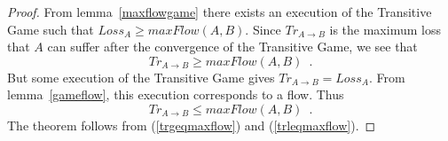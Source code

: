 \begin{proof}%
  From lemma~\ref{maxflowgame} there exists an execution of the Transitive Game such that
  $Loss_A \geq maxFlow\left(A, B\right)$.
  Since $Tr_{A \rightarrow B}$ is the maximum loss that $A$ can suffer after the convergence of the Transitive Game, we
  see that
  \begin{equation}
  \label{trgeqmaxflow}
     Tr_{A \rightarrow B} \geq maxFlow\left(A, B\right) \enspace.
  \end{equation}
  But some execution of the Transitive Game gives $Tr_{A \rightarrow B} = Loss_A$.
  From lemma~\ref{gameflow}, this execution corresponds to a flow. Thus
  \begin{equation}
  \label{trleqmaxflow}
     Tr_{A \rightarrow B} \leq maxFlow\left(A, B\right) \enspace.
  \end{equation}
  The theorem follows from (\ref{trgeqmaxflow}) and (\ref{trleqmaxflow}).
\end{proof}
